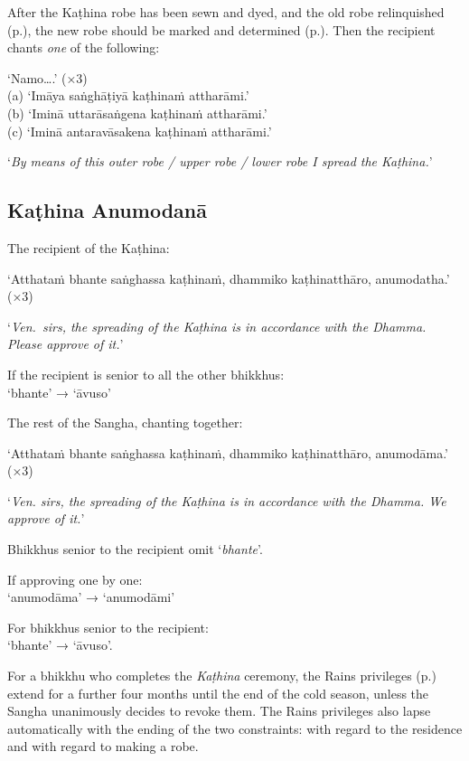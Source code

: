 After the Kaṭhina robe has been sewn and dyed, and the old robe relinquished
(p.\pageref{relinquish-robe}), the new robe should be marked and determined
(p.\pageref{determine-robe}). Then the recipient chants \emph{one} of the
following:

‘Namo….’ (×3)\\
(a) ‘Imāya saṅghāṭiyā kaṭhinaṁ attharāmi.’\\
(b) ‘Iminā uttarāsaṅgena kaṭhinaṁ attharāmi.’\\
(c) ‘Iminā antaravāsakena kaṭhinaṁ attharāmi.’

‘\emph{By means of this outer robe / upper robe / lower robe I spread the Kaṭhina.}’


\subsection{Kaṭhina Anumodanā}
\label{kathina-anumodana}

The recipient of the Kaṭhina:

‘Atthataṁ bhante saṅghassa kaṭhinaṁ, dhammiko kaṭhinatthāro, anumodatha.’ (×3)

‘\emph{Ven.\ sirs, the spreading of the Kaṭhina is in accordance with the Dhamma.
  Please approve of it.}’

If the recipient is senior to all the other bhikkhus:\\
‘bhante’ → ‘āvuso’

The rest of the Sangha, chanting together:

‘Atthataṁ bhante saṅghassa kaṭhinaṁ, dhammiko kaṭhinatthāro, anumodāma.’ (×3)

‘\emph{Ven. sirs, the spreading of the Kaṭhina is in accordance with the Dhamma.
  We approve of it.}’


Bhikkhus senior to the recipient omit ‘\emph{bhante}’.

If approving one by one:\\
‘anumodāma’ → ‘anumodāmi’

For bhikkhus senior to the recipient:\\
‘bhante’ → ‘āvuso’.

For a bhikkhu who completes the \emph{Kaṭhina} ceremony, the Rains privileges
(p.\pageref{rains-privileges}) extend for a further four months until the end of
the cold season, unless the Sangha unanimously decides to revoke them. The Rains
privileges also lapse automatically with the ending of the two constraints: with
regard to the residence and with regard to making a robe.

